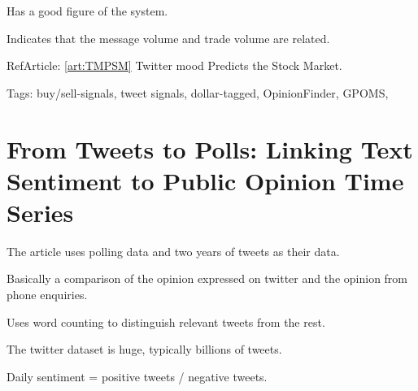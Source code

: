 Has a good figure of the system. 

Indicates that the message volume and trade volume are related. 

RefArticle: \ref{art:TMPSM} Twitter mood Predicts the Stock Market.

Tags: buy/sell-signals, tweet signals, dollar-tagged, OpinionFinder, GPOMS, 

\section{From Tweets to Polls: Linking Text Sentiment to Public Opinion
Time
Series}

The article uses polling data and two years of tweets as their data. 

Basically a comparison of the opinion expressed on twitter and the opinion from
phone enquiries. 

Uses word counting to distinguish relevant tweets from the rest. 

The twitter dataset is huge, typically billions of tweets. 

Daily sentiment = positive tweets / negative tweets.


